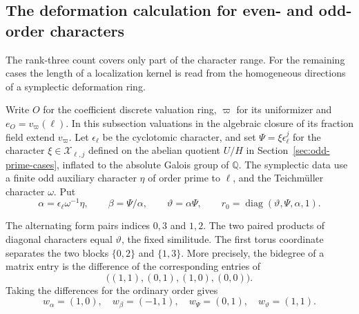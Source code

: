 \subsection{The deformation calculation for even- and odd-order characters}
\label{sec:rank-four-deformation}
\hypertarget{source-ordinary-symplectic-cohomology}{}

The rank-three count covers only part of the character range. For the remaining cases the length of a localization kernel is read from the homogeneous directions of a symplectic deformation ring.

Write \(O\) for the coefficient discrete valuation ring, \(\varpi\)
for its uniformizer and \(e_O=v_\varpi(\ell)\). In this subsection
valuations in the algebraic closure of its fraction field extend
\(v_\varpi\). Let \(\epsilon_\ell\) be the cyclotomic character,
and set \(\Psi=\xi\epsilon_\ell^j\) for the character \(\xi\in\mathcal X_{\ell,j}\) defined on the abelian quotient \(U/H\) in Section~\ref{sec:odd-prime-cases}, inflated to the absolute Galois group of \(\mathbb Q\). The symplectic data use a finite odd
auxiliary character \(\eta\) of order prime to \(\ell\), and
the Teichm\"uller character \(\omega\). Put
\[
 \alpha=\epsilon_\ell\omega^{-1}\eta,\qquad
 \beta=\Psi/\alpha,\qquad \vartheta=\alpha\Psi,\qquad
 r_0=\operatorname{diag}(\vartheta,\Psi,\alpha,1).
\]


The alternating form pairs indices \(0,3\) and \(1,2\).
The two paired products of diagonal characters equal \(\vartheta\),
the fixed similitude. The first torus coordinate separates the two blocks
\(\{0,2\}\) and \(\{1,3\}\). More precisely,
the bidegree of a matrix entry is the difference of the
corresponding entries of
\[
              \big((1,1),(0,1),(1,0),(0,0)\big).
\]
Taking the differences for the ordinary order gives
\[
    w_\alpha=(1,0),\quad w_\beta=(-1,1),\quad
    w_\Psi=(0,1),\quad w_\vartheta=(1,1).
\]

